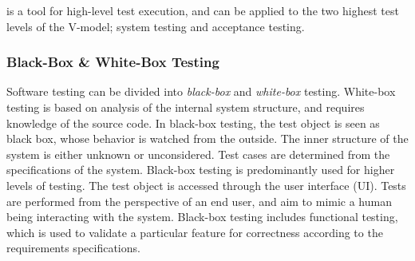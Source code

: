 
\toolname \space is a tool for high-level test execution, and can be applied to the two highest test levels of the V-model; system testing and acceptance testing.


\subsubsection{Black-Box \& White-Box Testing}
\noindent Software testing can be divided into \emph{black-box} and \emph{white-box} testing. White-box testing is based on analysis of the internal system structure, and requires knowledge of the source code. In black-box testing, the test object is seen as black box, whose behavior is watched from the outside. The inner structure of the system is either unknown or unconsidered. Test cases are determined from the specifications of the system. Black-box testing is predominantly used for higher levels of testing. The test object is accessed through the user interface (UI). Tests are performed from the perspective of an end user, and aim to mimic a human being interacting with the system. Black-box testing includes functional testing, which is used to validate a particular feature for correctness according to the requirements specifications. \cite{SoftwareTestingFoundations}

